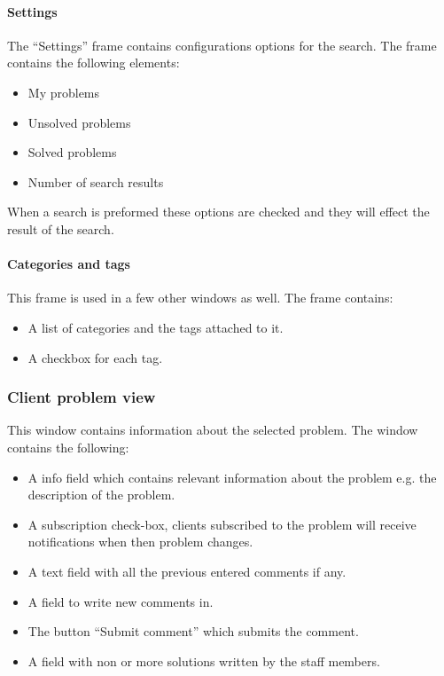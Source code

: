 \paragraph{Settings}
The ``Settings'' frame contains configurations options for the search.
The frame contains the following elements:
\begin{itemize}
	\item My problems 
	\item Unsolved problems
	\item Solved problems 
	\item Number of search results
\end{itemize}
When a search is preformed these options are checked and they will effect the result of the search.

\paragraph{Categories and tags} 
This frame is used in a few other windows as well. 
The frame contains:
\begin{itemize}
	\item A list of categories and the tags attached to it. 
	\item A checkbox for each tag.
\end{itemize} 

\subsubsection{Client problem view}
This window contains information about the selected problem. The window contains the following:
\begin{itemize}
	\item A info field which contains relevant information about the problem e.g. the description of the problem.
	\item A subscription check-box, clients subscribed to the problem will receive notifications when then problem changes. 
	\item A text field with all the previous entered comments if any.
	\item A field to write new comments in.
	\item The button ``Submit comment'' which submits the comment.
	\item A field with non or more solutions written by the staff members.  
\end{itemize}



